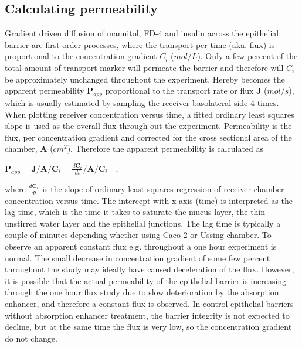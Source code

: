 \subsection{Calculating permeability}
\label{calcPerm}
Gradient driven diffusion of mannitol, FD-4 and insulin across the epithelial barrier are first order processes, where the transport per time (aka. flux) is proportional to the concentration gradient $C_i$ ($mol/L$). Only a few percent of the total amount of transport marker will permeate the barrier and therefore will $C_i$ be approximately unchanged throughout the experiment. Hereby becomes the apparent permeability $\bm{P}_{app}$ proportional to the transport rate or flux $\bm{J}$ ($mol/s$), which is usually estimated by sampling the receiver basolateral side 4 times. When plotting receiver concentration versus time, a fitted ordinary least squares slope is used as the overall flux through out the experiment. Permeability is the flux, per concentration gradient and corrected for the cross sectional area of the chamber, $\bm{A}$ ($cm^2$). Therefore the apparent permeability is calculated as

$\bm{P}_{app} = \bm{J} / \bm{A} / \bm{C}_i = \frac{d\bm{C}_r}{dt} / \bm{A} / \bm{C}_i \quad ,$

where $\frac{d\bm{C}_r}{dt}$ is the slope of ordinary least squares regression of receiver chamber concentration versus time. The intercept with x-axis (time) is interpreted as the lag time, which is the time it takes to saturate the mucus layer, the thin unstirred water layer and the epithelial junctions. The lag time is typically a couple of minutes depending whether using Caco-2 or Ussing chamber. To observe an apparent constant flux e.g. throughout a one hour experiment is normal. The small decrease in concentration gradient of some few percent throughout the study may ideally have caused deceleration of the flux. However, it is possible that the actual permeability of the epithelial barrier is increasing through the one hour flux study due to slow deterioration by the absorption enhancer, and therefore a constant flux is observed. In control epithelial barriers without absorption enhancer treatment, the barrier integrity is not expected to decline, but at the same time the flux is very low, so the concentration gradient do not change.

